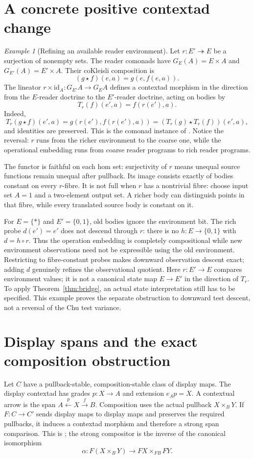 \documentclass[11pt]{article}
\theoremstyle{definition}\newtheorem{definition}[theorem]{Definition}
\theoremstyle{remark}\newtheorem{remark}[theorem]{Remark}
\newtheorem{example}[theorem]{Example}
\newcommand{\id}{\mathrm{id}}
\begin{document}
\section{A concrete positive contextad change}
\begin{example}[Refining an available reader environment]\label{ex:reader}
Let $r:E'\twoheadrightarrow E$ be a surjection of nonempty sets. The reader
comonads have $G_E(A)=E\times A$ and $G_{E'}(A)=E'\times A$. Their coKleisli
composition is
\[
 (g\star f)(e,a)=g(e,f(e,a)).
\]
The lineator $r\times\id_A:G_{E'}A\to G_EA$ defines a contextad morphism
in the direction from the $E$-reader doctrine to the $E'$-reader doctrine,
acting on bodies by
\[
 T_r(f)(e',a)=f(r(e'),a).
\]
Indeed,
\[
 T_r(g\star f)(e',a)
 =g(r(e'),f(r(e'),a))
 =(T_r(g)\star T_r(f))(e',a),
\]
and identities are preserved. This is the comonad instance of
\cite[Example 5.33]{CM2}. Notice the reversal: $r$ runs from the richer
environment to the coarse one, while the operational embedding runs from
coarse reader programs to rich reader programs.

The functor is faithful on each hom set: surjectivity of $r$ means unequal
source functions remain unequal after pullback. Its image consists exactly
of bodies constant on every $r$-fibre. It is not full when $r$ has a nontrivial fibre: choose input set $A=1$
and a two-element output set. A richer body can distinguish points in that
fibre, while every translated source body is constant on it.

For $E=\{*\}$ and $E'=\{0,1\}$, old bodies ignore the environment bit.
The rich probe $d(e')=e'$ does not descend through $r$: there is no
$h:E\to\{0,1\}$ with $d=h\circ r$. Thus the operation embedding is
completely compositional while new environment observations need not be
expressible using the old environment. Restricting to fibre-constant probes
makes downward observation descent exact; adding $d$ genuinely refines the
observational quotient. Here $r:E'\to E$ compares environment values; it
is not a canonical state map $E\to E'$ in the direction of $T_r$. To apply
Theorem~\ref{thm:bridge}, an actual state interpretation still has to be
specified. This example proves the separate obstruction to downward test
descent, not a reversal of the Chu test variance.
\end{example}

\section{Display spans and the exact composition obstruction}
Let $C$ have a pullback-stable, composition-stable class of display maps.
The display contextad has grades $p:X\to A$ and extension $e_Ap=X$.
A contextual arrow is the span $A\xleftarrow{p}X\xrightarrow{f}B$.
Composition uses the actual pullback $X\times_BY$.
If $F:C\to C'$ sends display maps to display maps and preserves the required
pullbacks, it induces a contextad morphism and therefore a strong span
comparison. This is \cite[Example 5.35]{CM2}; the strong compositor is the
inverse of the canonical isomorphism
\begin{equation}\label{eq:pullback-map}
 \alpha:F(X\times_BY)\longrightarrow FX\times_{FB}FY.
\end{equation}
\end{document}
